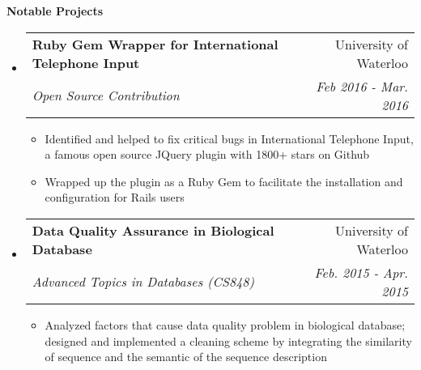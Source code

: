 \documentclass[letterpaper,10pt]{article}
\makeatletter
\newcommand{\resitem}[1]{\item #1 \vspace{-2pt}}
\newcommand{\resheading}[1]{{\large \colorbox{mygrey}{\begin{minipage}{\textwidth}{\textbf{#1 \vphantom{p\^{E}}}}\end{minipage}}}}
\newcommand{\ressubheading}[4]{
\begin{tabular*}{7.0in}{l@{\extracolsep{\fill}}r}
		\textbf{#1} & #2 \\
		\textit{#3} & \textit{#4} \\
\end{tabular*}\vspace{-6pt}}
\makeatother
\begin{document}
\resheading{Notable Projects}
\begin{itemize}
\itemsep0em
\item
    \ressubheading{Ruby Gem Wrapper for International Telephone Input}{University of Waterloo}{Open Source Contribution}{Feb 2016 - Mar. 2016}
	\begin{itemize}
        \resitem{Identified and helped to fix critical bugs in International Telephone Input, a famous open source JQuery plugin with 1800+ stars on Github}
		\resitem{Wrapped up the plugin as a Ruby Gem to facilitate the installation and configuration for Rails users}
	\end{itemize}
\item
	\ressubheading{Data Quality Assurance in Biological Database}{University of Waterloo}{ Advanced Topics in Databases (CS848)}{ Feb. 2015 - Apr. 2015}
	\begin{itemize}
		\resitem{Analyzed factors that cause data quality problem in biological database; designed and implemented a cleaning scheme by integrating the similarity of sequence and the semantic of the sequence description}
	\end{itemize}
	
\end{itemize}
\end{document}
